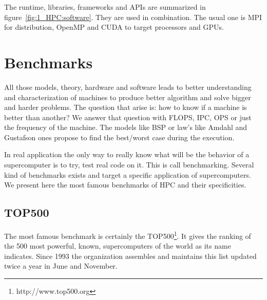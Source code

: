 The runtime, libraries, frameworks and APIs are summarized in figure~\ref{fig:1_HPC:software}.
They are used in combination. 
The usual one is MPI for distribution, OpenMP and CUDA to target processors and GPUs. 


\section{Benchmarks}
All those models, theory, hardware and software leads to better understanding and characterization of machines to produce better algorithm and solve bigger and harder problems. 
The question that arise is: how to know if a machine is better than another? 
We answer that question with FLOPS, IPC, OPS or just the frequency of the machine. 
The models like BSP or law's like Amdahl and Gustafson ones propose to find the best/worst case during the execution.

In real application the only way to really know what will be the behavior of a supercomputer is to try, test real code on it. 
This is call benchmarking.
Several kind of benchmarks exists and target a specific application of supercomputers. 
We present here the most famous benchmarks of HPC and their specificities.

\subsection{TOP500}
The most famous benchmark is certainly the TOP500\footnote{http://www.top500.org}. 
It gives the ranking of the 500 most powerful, known, supercomputers of the world as its name indicates.
Since 1993 the organization assembles and maintains this list updated twice a year in June and November.

